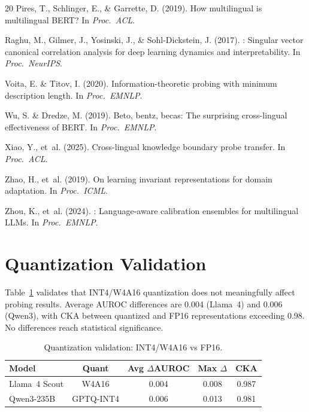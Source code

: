 \documentclass[11pt,a4paper]{article}
\begin{document}
\begin{thebibliography}{20}
Pires, T., Schlinger, E., \& Garrette, D. (2019).
\newblock How multilingual is multilingual {BERT}?
\newblock In {\em Proc.\ ACL}.

Raghu, M., Gilmer, J., Yosinski, J., \& Sohl-Dickstein, J. (2017).
: Singular vector canonical correlation analysis for deep learning dynamics and interpretability.
\newblock In {\em Proc.\ NeurIPS}.

Voita, E. \& Titov, I. (2020).
\newblock Information-theoretic probing with minimum description length.
\newblock In {\em Proc.\ EMNLP}.

Wu, S. \& Dredze, M. (2019).
\newblock Beto, bentz, becas: The surprising cross-lingual effectiveness of {BERT}.
\newblock In {\em Proc.\ EMNLP}.

Xiao, Y., et~al. (2025).
\newblock Cross-lingual knowledge boundary probe transfer.
\newblock In {\em Proc.\ ACL}.

Zhao, H., et~al. (2019).
\newblock On learning invariant representations for domain adaptation.
\newblock In {\em Proc.\ ICML}.

Zhou, K., et~al. (2024).
: Language-aware calibration ensembles for multilingual {LLMs}.
\newblock In {\em Proc.\ EMNLP}.

\end{thebibliography}


\appendix

\section{Quantization Validation}
\label{app:quantization}

Table~\ref{tab:quant} validates that INT4/W4A16 quantization does not meaningfully affect probing results.
Average AUROC differences are 0.004 (Llama~4) and 0.006 (Qwen3), with CKA between quantized and FP16 representations exceeding 0.98.
No differences reach statistical significance.

\begin{table}[h]
\centering
\caption{Quantization validation: INT4/W4A16 vs FP16.}
\label{tab:quant}
\small
\begin{tabular}{lcccc}
\toprule
\textbf{Model} & \textbf{Quant} & \textbf{Avg $\Delta$AUROC} & \textbf{Max $\Delta$} & \textbf{CKA} \\
\midrule
Llama~4 Scout & W4A16     & 0.004 & 0.008 & 0.987 \\
Qwen3-235B    & GPTQ-INT4 & 0.006 & 0.013 & 0.981 \\
\bottomrule
\end{tabular}
\end{table}
\end{document}
